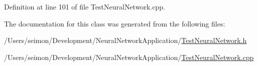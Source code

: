 Definition at line 101 of file TestNeuralNetwork.cpp.



The documentation for this class was generated from the following files:\begin{DoxyCompactItemize}
\item 
/Users/seimon/Development/NeuralNetworkApplication/\hyperlink{_test_neural_network_8h}{TestNeuralNetwork.h}\item 
/Users/seimon/Development/NeuralNetworkApplication/\hyperlink{_test_neural_network_8cpp}{TestNeuralNetwork.cpp}\end{DoxyCompactItemize}
